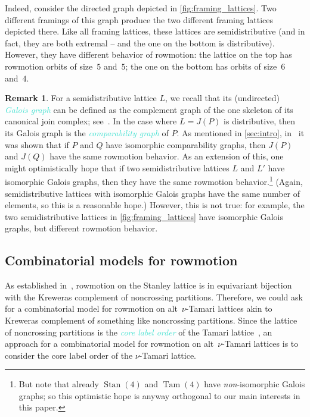 \documentclass[11pt]{amsart}
\newcommand{\Tam}[1]{\operatorname{Tam}({#1})}
\newcommand{\Stan}[1]{\operatorname{Stan}({#1})}
\newcommand{\dfn}[1]{\textcolor{Turquoise}{\emph{#1}}}
\theoremstyle{definition}
\newtheorem{remark}[theorem]{Remark}
\begin{document}
Indeed, consider the directed graph depicted in \cref{fig:framing_lattices}. Two different framings of this graph produce the two different framing lattices depicted there. Like all framing lattices, these lattices are semidistributive (and in fact, they are both extremal -- and the one on the bottom is distributive). However, they have different behavior of rowmotion: the lattice on the top has rowmotion orbits of size~$5$ and~$5$; the one on the bottom has orbits of size~$6$ and~$4$.

\begin{remark}
For a semidistributive lattice $L$, we recall that its (undirected) \dfn{Galois graph} can be defined as the complement graph of the one skeleton of its canonical join complex;  see~\cite{barnard2019canonical, thomas2019rowmotion, thomas2019independence}. In the case where $L=J(P)$ is distributive, then its Galois graph is the \dfn{comparability graph} of $P$. As mentioned in \cref{sec:intro}, in~\cite[Proposition~4.10]{hopkins2022minuscule} it was shown that if $P$ and $Q$ have isomorphic comparability graphs, then $J(P)$ and $J(Q)$ have the same rowmotion behavior. As an extension of this, one might optimistically hope that if two semidistributive lattices $L$ and $L'$ have isomorphic Galois graphs, then they have the same rowmotion behavior.\footnote{But note that already $\Stan{4}$ and $\Tam{4}$ have \emph{non}-isomorphic Galois graphs; so this optimistic hope is anyway orthogonal to our main interests in this paper.} (Again, semidistributive lattices with isomorphic Galois graphs have the same number of elements, so this is a reasonable hope.) However, this is not true: for example, the two semidistributive lattices in \cref{fig:framing_lattices} have isomorphic Galois graphs, but different rowmotion behavior.
\end{remark}

\subsection{Combinatorial models for rowmotion}

As established in~\cite{armstrong2013uniform}, rowmotion on the Stanley lattice is in equivariant bijection with the Kreweras complement of noncrossing partitions. Therefore, we could ask for a combinatorial model for rowmotion on alt~$\nu$-Tamari lattices akin to Kreweras complement of something like noncrossing partitions. Since the lattice of noncrossing partitions is the \dfn{core label order} of the Tamari lattice~\cite{reading2011noncrossing,muhle2019core}, an approach for a combinatorial model for rowmotion on alt~$\nu$-Tamari lattices is to consider the core label order of the $\nu$-Tamari lattice.
\end{document}
